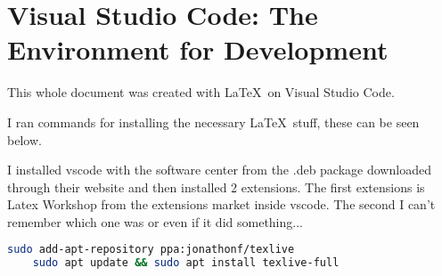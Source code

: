 

\pagebreak
\section{Visual Studio Code: The Environment for Development}

\par This whole document was created with \LaTeX \ on Visual Studio Code. 
\par I ran commands for installing the necessary \LaTeX \ stuff, these can be seen below.
\par I installed vscode with the software center from the .deb package downloaded through their website and then installed 2 extensions. The first extensions is Latex Workshop from the extensions market inside vscode. The second I can't remember which one was or even if it did something...

\vspace{.5cm}
\begin{lstlisting}[language=bash] 
    sudo add-apt-repository ppa:jonathonf/texlive
    sudo apt update && sudo apt install texlive-full
\end{lstlisting}
\vspace{.5cm}



